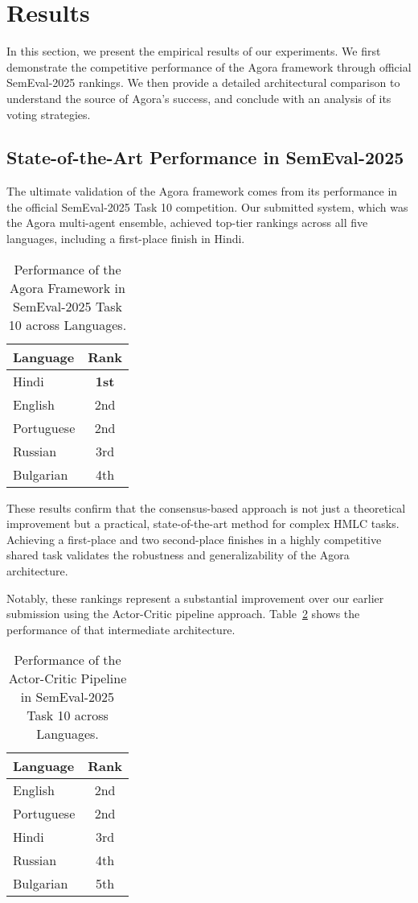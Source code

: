\section{Results}

In this section, we present the empirical results of our experiments. We first demonstrate the competitive performance of the Agora framework through official SemEval-2025 rankings. We then provide a detailed architectural comparison to understand the source of Agora's success, and conclude with an analysis of its voting strategies.

\subsection{State-of-the-Art Performance in SemEval-2025}

The ultimate validation of the Agora framework comes from its performance in the official SemEval-2025 Task 10 competition. Our submitted system, which was the Agora multi-agent ensemble, achieved top-tier rankings across all five languages, including a first-place finish in Hindi.

\begin{table}[ht]
\centering
\caption{Performance of the Agora Framework in SemEval-2025 Task 10 across Languages.}
\label{tab:semeval_rankings}
\begin{tabular}{lc}
\hline
\textbf{Language} & \textbf{Rank} \\
\hline
Hindi & \textbf{1st} \\
English & 2nd \\
Portuguese & 2nd \\
Russian & 3rd \\
Bulgarian & 4th \\
\hline
\end{tabular}
\end{table}

These results confirm that the consensus-based approach is not just a theoretical improvement but a practical, state-of-the-art method for complex HMLC tasks. Achieving a first-place and two second-place finishes in a highly competitive shared task validates the robustness and generalizability of the Agora architecture.

Notably, these rankings represent a substantial improvement over our earlier submission using the Actor-Critic pipeline approach. Table~\ref{tab:actor_critic_rankings} shows the performance of that intermediate architecture.

\begin{table}[ht]
\centering
\caption{Performance of the Actor-Critic Pipeline in SemEval-2025 Task 10 across Languages.}
\label{tab:actor_critic_rankings}
\begin{tabular}{lc}
\hline
\textbf{Language} & \textbf{Rank} \\
\hline
English & 2nd \\
Portuguese & 2nd \\
Hindi & 3rd \\
Russian & 4th \\
Bulgarian & 5th \\
\hline
\end{tabular}
\end{table}

